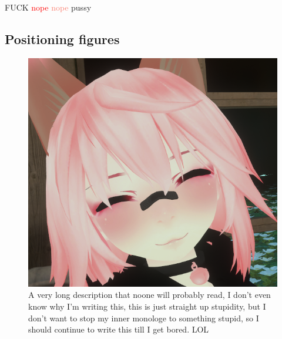 \documentclass[a4paper]{article}
\begin{document}

	\pagecolor{wolf}
	\textcolor{ugly}{FUCK}
	{\color[rgb]{0,1,1}}
	\textcolor{red}{nope}
	\textcolor{Salmon}{nope}
	\textcolor{NavyBlue}{pussy}
	\blindtext[2]

	\setcounter{figure}{25}

	\subsection{Positioning figures}
	\begin{figure}
		\centering
		\includegraphics{VRchat_profile.png}
		\caption[Description]{A very long description that noone will probably read, I don't even know why I'm writing this, this is just straight up stupidity, but I don't want to stop my inner monologe to something stupid, so I should continue to write this till I get bored. LOL}
		\label{Fig:nyaaa}
	\end{figure}
	\blindtext {}
\end{document}
